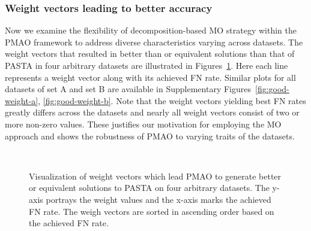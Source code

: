 \subsubsection{Weight vectors leading to better accuracy}
Now we examine the flexibility of decomposition-based MO strategy within the PMAO framework to address diverse characteristics varying across datasets. The weight vectors that resulted in better than or equivalent solutions than that of PASTA in four arbitrary datasets are illustrated in Figures~\ref{fig:good-weight}. Here each line represents a weight vector along with its achieved FN rate. Similar plots for all datasets of set A and set B are available in Supplementary Figures~\ref{fig:good-weight-a}, \ref{fig:good-weight-b}. Note that the weight vectors yielding best FN rates greatly differs across the datasets and nearly all weight vectors consist of two or more non-zero values. These justifies our motivation for employing the MO approach and shows the robustness of PMAO to varying traits of the datasets. 

\begin{figure}[!htbp]%
	\begin{adjustwidth}{-1cm}{}
		\centering
		\\
	\end{adjustwidth}
	\caption{Visualization of weight vectors which lead PMAO to generate better or equivalent solutions to PASTA on four arbitrary datasets. The y-axis portrays the weight values and the x-axis marks the achieved FN rate. The weigh vectors are sorted in ascending order based on the achieved FN rate. }
	\label{fig:good-weight}
\end{figure}


